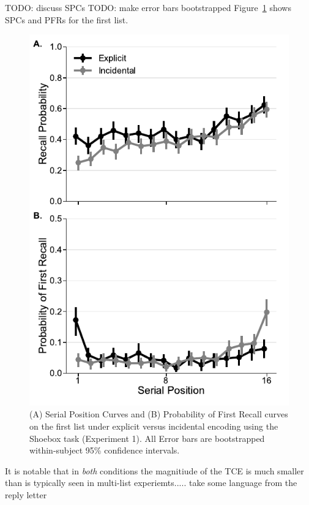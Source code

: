 \documentclass[jou,natbib,floatsintext]{apa6} %
\begin{document}
TODO: discuss SPCs
TODO: make error bars bootstrapped
\color{red}
Figure~\ref{e1_l1_spc} shows SPCs and PFRs for the first list.

\newcommand\spcpaneltext{All Error bars are bootstrapped within-subject 95\% confidence intervals.}
\begin{figure}
\includegraphics{figures/E1_spc_list1.pdf}
\caption{(A) Serial Position Curves and (B) Probability of First Recall curves on the first list under explicit versus incidental encoding using the Shoebox task (Experiment 1). \spcpaneltext}
\label{e1_l1_spc}
\end{figure}

\color{black}


\color{red}
\label{TODO-5} It is notable that in \emph{both} conditions the magnitiude of the TCE is much smaller than is typically seen in multi-list experiemts..... take some language from the reply letter
\end{document}
